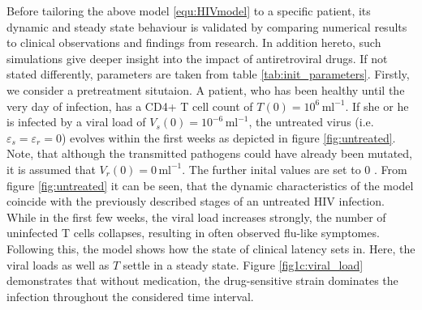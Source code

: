 Before tailoring the above model \ref{equ:HIVmodel} to a specific patient, its dynamic and steady state behaviour is validated by comparing numerical results 
to clinical observations and findings from research.
In addition hereto, such simulations give deeper insight into the impact of antiretroviral drugs.
If not stated differently, parameters are taken from table \ref{tab:init_parameters}.\newline
Firstly, we consider a pretreatment situtaion.
A patient, who has been healthy until the very day of infection, has a CD4+ T cell count of $T(0) = 10^{6} \, \text{ml}^{-1}$.
If she or he is infected by a viral load of $V_s(0) = 10^{-6} \, \text{ml}^{-1}$, the untreated virus (i.e. $\varepsilon_s = \varepsilon_r = 0$) 
evolves within the first weeks as depicted in figure \ref{fig:untreated}.
Note, that although the transmitted pathogens could have already been mutated, it is assumed that $V_r(0) = 0\, \text{ml}^{-1}$.
The further inital values are set to $0$ \cite{perelson1993dynamics}.\newline
From figure \ref{fig:untreated} it can be seen, that the dynamic characteristics of the model coincide with the previously described stages
of an untreated HIV infection.
While in the first few weeks, the viral load increases strongly, the number of uninfected T cells collapses, resulting in often observed flu-like 
symptomes. 
Following this, the model shows how the state of clinical latency sets in.
Here, the viral loads as well as $T$ settle in a steady state.
Figure \ref{fig1c:viral_load} demonstrates that without medication, the drug-sensitive strain dominates the infection throughout the 
considered time interval.

